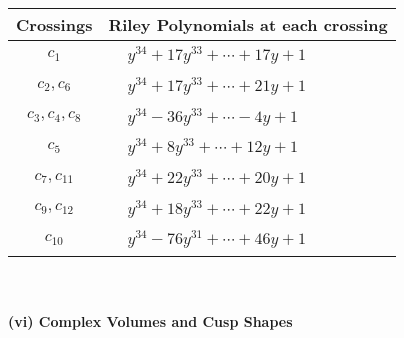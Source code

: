 \documentclass[1p]{elsarticle_modified}
\theoremstyle{definition}
\begin{document}
\begin{tabular}{m{50pt}|m{274pt}}
Crossings & \hspace{64pt}Riley Polynomials at each crossing \\
\hline $$\begin{aligned}c_{1}\end{aligned}$$&$\begin{aligned}
&y^{34}+17 y^{33}+\cdots+17 y+1
\end{aligned}$\\
\hline $$\begin{aligned}c_{2},c_{6}\end{aligned}$$&$\begin{aligned}
&y^{34}+17 y^{33}+\cdots+21 y+1
\end{aligned}$\\
\hline $$\begin{aligned}c_{3},c_{4},c_{8}\end{aligned}$$&$\begin{aligned}
&y^{34}-36 y^{33}+\cdots-4 y+1
\end{aligned}$\\
\hline $$\begin{aligned}c_{5}\end{aligned}$$&$\begin{aligned}
&y^{34}+8 y^{33}+\cdots+12 y+1
\end{aligned}$\\
\hline $$\begin{aligned}c_{7},c_{11}\end{aligned}$$&$\begin{aligned}
&y^{34}+22 y^{33}+\cdots+20 y+1
\end{aligned}$\\
\hline $$\begin{aligned}c_{9},c_{12}\end{aligned}$$&$\begin{aligned}
&y^{34}+18 y^{33}+\cdots+22 y+1
\end{aligned}$\\
\hline $$\begin{aligned}c_{10}\end{aligned}$$&$\begin{aligned}
&y^{34}-76 y^{31}+\cdots+46 y+1
\end{aligned}$\\
\hline
\end{tabular}\\~\\
\newpage\flushleft \textbf{(vi) Complex Volumes and Cusp Shapes}
\end{document}
